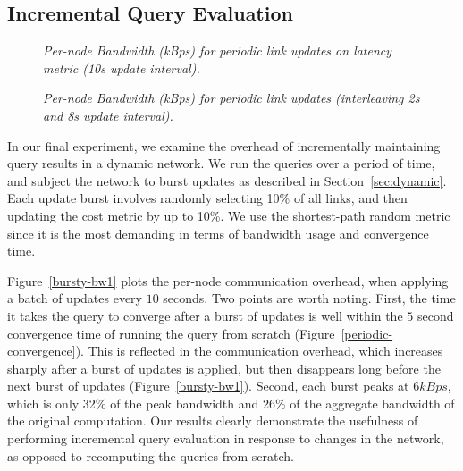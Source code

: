\subsection{Incremental Query Evaluation}
\label{subsec:expr:dynamic}

\begin{figure}[ht]
\centering
 \begin{minipage}{.45\linewidth}
  \begin{center}
    \small{\caption{\label{bursty-bw1}\emph{\small Per-node Bandwidth (kBps) for
    periodic link updates on latency metric (10s update interval).}}}
    \end{center}
 \end{minipage}
\hfill
 \begin{minipage}{.45\linewidth}
  \begin{center}
    \small{\caption{\label{bursty-bw2}\emph{\small
    Per-node Bandwidth (kBps) for periodic link updates (interleaving 2s and 8s
    update interval).}}}
  \end{center}
 \end{minipage}
\end{figure}


In our final experiment, we examine the overhead of incrementally
maintaining query results in a dynamic network. We run the queries
over a period of time, and subject the network to burst updates as
described in Section~\ref{sec:dynamic}.  Each update burst involves
randomly selecting 10\% of all links, and then updating the cost
metric by up to 10\%. We use the shortest-path random metric since it
is the most demanding in terms of bandwidth usage and
convergence time.

Figure~\ref{bursty-bw1} plots the per-node communication overhead,
when applying a batch of updates every $10$ seconds. Two points are worth
noting. First, the time it takes the query to converge after a burst
of updates is well within the $5$ second convergence time of running the
query from scratch (Figure~\ref{periodic-convergence}). This is
reflected in the communication overhead, which increases sharply after
a burst of updates is applied, but then disappears long before the next
burst of updates (Figure~\ref{bursty-bw1}). Second, each burst peaks
at $6 kBps$, which is only 32\% of the peak bandwidth and 26\% of the
aggregate bandwidth of the original computation. Our results clearly
demonstrate the usefulness of performing incremental query evaluation
in response to changes in the network, as opposed to recomputing the
queries from scratch.     

